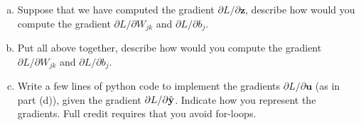 \documentclass[11pt]{article}
\newcommand{\ubf}{\mathbf{u}}
\newcommand{\zbf}{\mathbf{z}}
\begin{document}
\begin{enumerate}
\begin{enumerate}[(a)]
\item
Suppose that we have computed the gradient $\partial L/\partial \zbf$, describe how would you compute the gradient
 $\partial L/\partial W_{jk}$ and $\partial L/\partial b_j$.
 
 \item
 Put all above together, describe how would you compute the gradient  $\partial L/\partial W_{jk}$ and $\partial L/\partial b_j$.
 

\item Write a few lines of python code to implement the gradients  $\partial L/\partial \ubf$ (as in part (d)), given the gradient $\partial L/\partial \hat{\bf y}$.
Indicate how you represent the gradients.
Full credit requires that you avoid for-loops.
 
\end{enumerate}

\end{enumerate}
\end{document}
